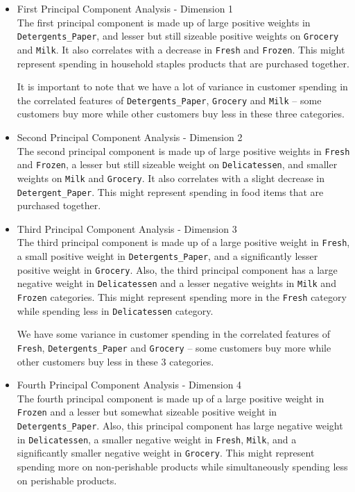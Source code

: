 \documentclass[twoside,openright,titlepage,numbers=noenddot,headinclude,%
               footinclude=true,cleardoublepage=empty,abstractoff,BCOR=5mm,%
               paper=a4,fontsize=11pt,ngerman,american]{scrreprt}
\numberwithin{theorem}{chapter}
\numberwithin{definition}{chapter}
\numberwithin{algorithm}{chapter}
\numberwithin{figure}{chapter}
\numberwithin{table}{chapter}
\numberwithin{equation}{chapter}
\begin{document}
\begin{itemize}

\item First Principal Component Analysis - Dimension 1 \\
The first principal component is made up of large positive weights in \texttt{Detergents\_Paper}, and lesser but still sizeable positive weights on \texttt{Grocery} and \texttt{Milk}. It also correlates with a decrease in \texttt{Fresh} and \texttt{Frozen}. This might represent spending in household staples products that are purchased together. 

It is important to note that we have a lot of variance in customer spending in the correlated features of \texttt{Detergents\_Paper}, \texttt{Grocery} and \texttt{Milk} -- some customers buy more while other customers buy less in these three categories.

\item Second Principal Component Analysis - Dimension 2\\
The second principal component is made up of large positive weights in \texttt{Fresh} and \texttt{Frozen}, a lesser but still sizeable weight on \texttt{Delicatessen}, and smaller weights on \texttt{Milk} and \texttt{Grocery}. It also correlates with a slight decrease in \texttt{Detergent\_Paper}. This might represent spending in food items that are purchased together.

\item Third Principal Component Analysis - Dimension 3\\
The third principal component is made up of a large positive weight in \texttt{Fresh}, a small positive weight in \texttt{Detergents\_Paper}, and a significantly lesser positive weight in \texttt{Grocery}. Also, the third principal component has a large negative weight in \texttt{Delicatessen} and a lesser negative weights in \texttt{Milk} and \texttt{Frozen} categories. This might represent spending more in the \texttt{Fresh} category while spending less in \texttt{Delicatessen} category.

We have some variance in customer spending in the correlated features of \texttt{Fresh}, \texttt{Detergents\_Paper} and \texttt{Grocery} -- some customers buy more while other customers buy less in these 3 categories.


\item Fourth Principal Component Analysis - Dimension 4\\
The fourth principal component is made up of a large positive weight in \texttt{Frozen} and a lesser but somewhat sizeable positive weight in \texttt{Detergents\_Paper}. Also, this principal component has large negative weight in \texttt{Delicatessen}, a smaller negative weight in \texttt{Fresh}, \texttt{Milk}, and a significantly smaller negative weight in \texttt{Grocery}. This might represent spending more on non-perishable products while simultaneously spending less on perishable products.
\end{itemize}
\end{document}
